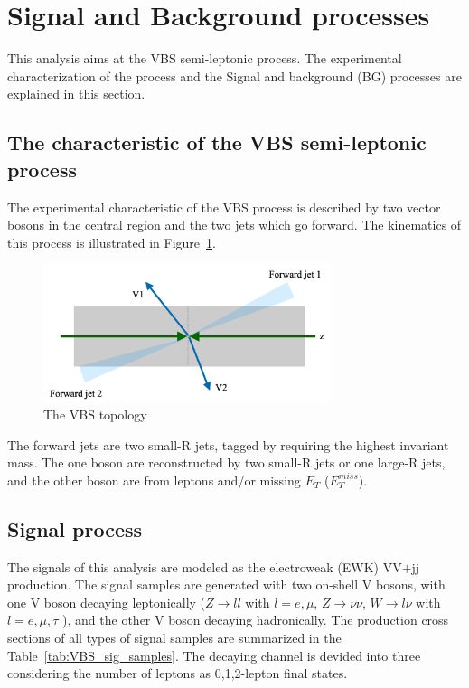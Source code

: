 \section{Signal and Background processes}

This analysis aims at the VBS semi-leptonic process. The experimental characterization of the process and the Signal and background (BG) processes are explained in this section.

\subsection{The characteristic of the VBS semi-leptonic process}
The experimental characteristic of the VBS process is described by two vector bosons in the central region and the two jets which go forward.
The kinematics of this process is illustrated in Figure~\ref{fig:VBStopology}.
\begin{figure}[tbp]
\begin{center}
 \includegraphics[width=0.75\textwidth,keepaspectratio]{figures/VBStopology}
\caption{
The VBS topology
}
\label{fig:VBStopology}
\end{center}
\end{figure}

The forward jets are two small-R jets, tagged by requiring the highest invariant mass. The one boson are reconstructed by two small-R jets or one large-R jets, and the other boson are from leptons and/or missing $E_T$ ($E_T^{miss}$).

\subsection{Signal process}

The signals of this analysis are modeled as the electroweak (EWK) VV$\plus$jj production. The signal samples are generated with two on-shell V bosons, with one V boson decaying leptonically ($Z \rightarrow ll$ with $l = e,\mu$, $Z \rightarrow \nu\nu$, $W\rightarrow l\nu$ with $l = e,\mu,\tau$ ), and the other V boson decaying hadronically. The production cross sections of all types of signal samples are summarized in the Table~\ref{tab:VBS_sig_samples}. The decaying channel is devided into three considering the number of leptons as 0,1,2-lepton final states. 


